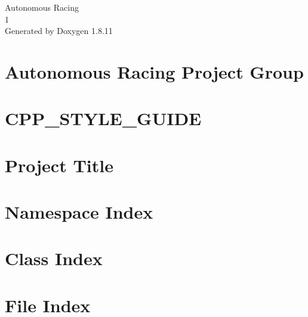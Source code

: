 \documentclass[twoside]{book}
\newcommand{\+}{\discretionary{\mbox{\scriptsize$\hookleftarrow$}}{}{}}
\newcommand{\clearemptydoublepage}{%
  \newpage{\pagestyle{empty}\cleardoublepage}%
}
\begin{document}
\hypersetup{pageanchor=false,
             bookmarksnumbered=true,
             pdfencoding=unicode
            }
\begin{titlepage}
\vspace*{7cm}
\begin{center}%
{\Large Autonomous Racing \\[1ex]\large 1 }\\
\vspace*{1cm}
{\large Generated by Doxygen 1.8.11}\\
\end{center}
\end{titlepage}
\clearemptydoublepage
\tableofcontents
\clearemptydoublepage
{}
\hypersetup{pageanchor=true}

\chapter{Autonomous Racing Project Group}
\label{index}\hypertarget{index}{}
\chapter{C\+P\+P\+\_\+\+S\+T\+Y\+L\+E\+\_\+\+G\+U\+I\+DE}
\label{md__home_travis_build_Autonomous-Racing-PG_ros.package_docs_master_CPP_STYLE_GUIDE}
\hypertarget{md__home_travis_build_Autonomous-Racing-PG_ros.package_docs_master_CPP_STYLE_GUIDE}{}

\chapter{Project Title}
\label{md__home_travis_build_Autonomous-Racing-PG_ros.package_docs_master_README}
\hypertarget{md__home_travis_build_Autonomous-Racing-PG_ros.package_docs_master_README}{}

\chapter{Namespace Index}

\chapter{Class Index}

\chapter{File Index}

\end{document}
